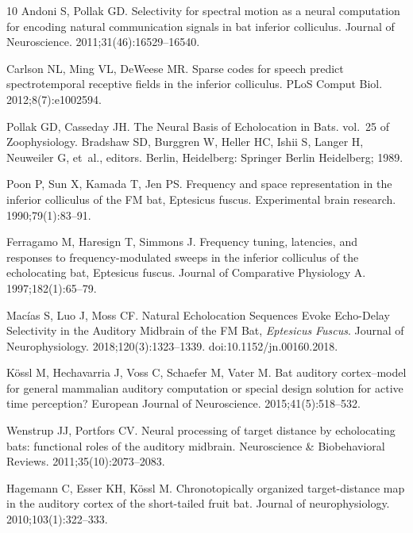 \documentclass[10pt,letterpaper]{article}
\begin{document}
\begin{thebibliography}{10}
	Andoni S, Pollak GD.
	\newblock Selectivity for spectral motion as a neural computation for encoding
	natural communication signals in bat inferior colliculus.
	\newblock Journal of Neuroscience. 2011;31(46):16529--16540.
	
	Carlson NL, Ming VL, DeWeese MR.
	\newblock Sparse codes for speech predict spectrotemporal receptive fields in
	the inferior colliculus.
	\newblock PLoS Comput Biol. 2012;8(7):e1002594.
	
	Pollak GD, Casseday JH.
	\newblock The {{Neural Basis}} of {{Echolocation}} in {{Bats}}. vol.~25 of
	Zoophysiology.
	\newblock Bradshaw SD, Burggren W, Heller HC, Ishii S, Langer H, Neuweiler G,
	et~al., editors. {Berlin, Heidelberg}: {Springer Berlin Heidelberg}; 1989.
	
	Poon P, Sun X, Kamada T, Jen PS.
	\newblock Frequency and space representation in the inferior colliculus of the
	FM bat, Eptesicus fuscus.
	\newblock Experimental brain research. 1990;79(1):83--91.
	
	Ferragamo M, Haresign T, Simmons J.
	\newblock Frequency tuning, latencies, and responses to frequency-modulated
	sweeps in the inferior colliculus of the echolocating bat, Eptesicus fuscus.
	\newblock Journal of Comparative Physiology A. 1997;182(1):65--79.
	
	Mac{\'i}as S, Luo J, Moss CF.
	\newblock Natural Echolocation Sequences Evoke Echo-Delay Selectivity in the
	Auditory Midbrain of the {{FM}} Bat, {{{\emph{Eptesicus}}}}{\emph{ Fuscus}}.
	\newblock Journal of Neurophysiology. 2018;120(3):1323--1339.
	\newblock doi:{10.1152/jn.00160.2018}.
	
	K{\"o}ssl M, Hechavarria J, Voss C, Schaefer M, Vater M.
	\newblock Bat auditory cortex--model for general mammalian auditory computation
	or special design solution for active time perception?
	\newblock European Journal of Neuroscience. 2015;41(5):518--532.
	
	Wenstrup JJ, Portfors CV.
	\newblock Neural processing of target distance by echolocating bats: functional
	roles of the auditory midbrain.
	\newblock Neuroscience \& Biobehavioral Reviews. 2011;35(10):2073--2083.
	
	Hagemann C, Esser KH, K{\"o}ssl M.
	\newblock Chronotopically organized target-distance map in the auditory cortex
	of the short-tailed fruit bat.
	\newblock Journal of neurophysiology. 2010;103(1):322--333.
	

\end{thebibliography}
\end{document}
